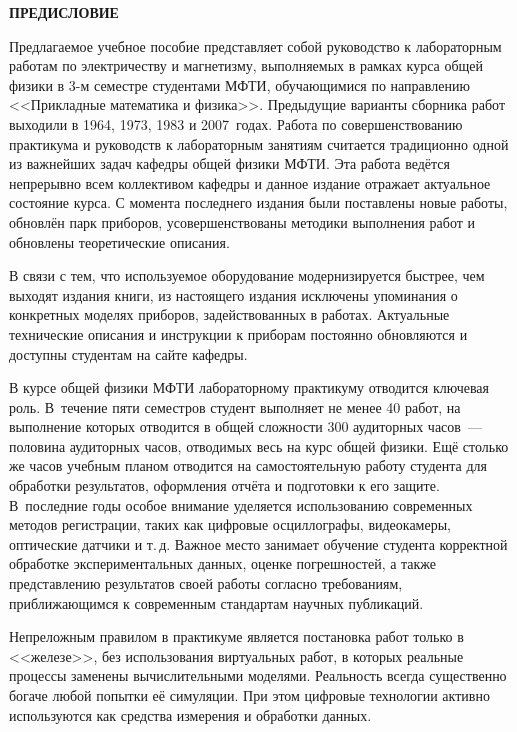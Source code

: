 \clearpage
{\noindent\large\bfseries ПРЕДИСЛОВИЕ}

\vspace{3pc}

Предлагаемое учебное пособие представляет собой руководство к
лабораторным работам по электричеству и магнетизму,
выполняемых в рамках курса общей физики в 3-м семестре студентами 
\mbox{МФТИ}, обучающимися по направлению <<Прикладные математика и физика>>. 
Предыдущие варианты сборника работ выходили в 1964, 1973, 1983 и 2007~годах.
Работа по совершенствованию практикума и руководств к лабораторным занятиям
считается традиционно одной из важнейших задач кафедры общей физики МФТИ.
Эта работа ведётся непрерывно всем коллективом кафедры и данное издание 
отражает актуальное состояние курса. С момента последнего издания были 
поставлены новые работы, обновлён парк приборов, усовершенствованы 
методики выполнения работ и обновлены теоретические описания.

В связи с тем, что используемое оборудование модернизируется быстрее,
чем выходят издания книги, из настоящего издания исключены упоминания
о конкретных моделях приборов, задействованных в работах. Актуальные 
технические описания и инструкции к приборам постоянно обновляются
и доступны студентам на сайте кафедры.

В курсе общей физики МФТИ лабораторному практикуму отводится ключевая роль.
В~течение пяти семестров студент выполняет не менее 40 работ, на выполнение
которых отводится в общей сложности 300 аудиторных часов~--- половина 
аудиторных часов, отводимых весь на курс общей физики. Ещё столько же часов 
учебным планом отводится 
на самостоятельную работу студента для обработки результатов, оформления
отчёта и подготовки к его защите. В~последние годы особое внимание 
уделяется использованию современных методов регистрации, таких как цифровые 
осциллографы, видеокамеры, оптические датчики и т.\,д. Важное место занимает 
обучение студента корректной обработке экспериментальных данных, 
оценке погрешностей, а также представлению результатов своей работы 
согласно требованиям, приближающимся к современным стандартам научных 
публикаций.

Непреложным правилом в практикуме является постановка работ только 
в <<железе>>, без использования виртуальных работ, в которых реальные 
процессы заменены вычислительными моделями. 
Реальность всегда существенно богаче любой попытки её симуляции. 
При этом цифровые технологии активно используются как средства измерения 
и обработки данных.

